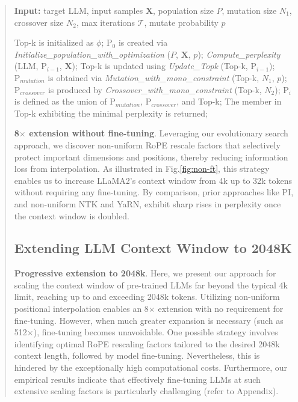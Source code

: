 \begin{abstract}
\begin{algorithm}[t]
	\small
	\caption{The search algorithm}
	\textbf{Input:} target LLM, input samples $\mathbf{X}$,   population size $P$, mutation size $N_1$, crossover size $N_2$, max iterations $\mathcal{T}$, mutate probability $p$\\

	\begin{algorithmic}[1]
		\label{alg:search}
		\STATE Top-k is initialized as $\phi$;	
		\STATE $\text{P}_0$ is created via \textit{Initialize\_population\_with\_optimization} ($P$, $\mathbf{X}$, $p$); 
		\STATE \textit{Compute\_perplexity} (LLM, $\text{P}_{i-1}$, $\mathbf{X}$);
		\STATE  Top-k is updated using \textit{Update\_Topk} (Top-k, $\text{P}_{i-1}$);
		\STATE$\text{P}_{mutation}$ is obtained via \textit{Mutation\_with\_mono\_constraint} (Top-k, $N_1$, $p$); 
		\STATE $\text{P}_{crossover}$ is produced by \textit{Crossover\_with\_mono\_constraint} (Top-k, $N_2$);
		\STATE $\text{P}_i$ is defined as the union of $\text{P}_{mutation}$, $\text{P}_{crossover}$, and Top-k;
		\ENDFOR
		\STATE The member in Top-k exhibiting the minimal perplexity is returned;
	\end{algorithmic}
\end{algorithm}

\textbf{8$\times$ extension without fine-tuning}. Leveraging our evolutionary search approach, we discover non-uniform RoPE rescale factors that selectively protect important dimensions and positions, thereby reducing information loss from interpolation. As illustrated in Fig.\ref{fig:non-ft}, this strategy enables us to increase LLaMA2's context window from 4k up to 32k tokens without requiring any fine-tuning. By comparison, prior approaches like PI, and non-uniform NTK and YaRN, exhibit sharp rises in perplexity once the context window is doubled.

\subsection{Extending LLM Context Window to 2048K}
\label{sec:extendto2048k}

\textbf{Progressive extension to 2048k}. Here, we present our approach for scaling the context window of pre-trained LLMs far beyond the typical 4k limit, reaching up to and exceeding 2048k tokens. Utilizing non-uniform positional interpolation enables an 8$\times$ extension with no requirement for fine-tuning. However, when much greater expansion is necessary (such as 512$\times$), fine-tuning becomes unavoidable. One possible strategy involves identifying optimal RoPE rescaling factors tailored to the desired 2048k context length, followed by model fine-tuning. Nevertheless, this is hindered by the exceptionally high computational costs. Furthermore, our empirical results indicate that effectively fine-tuning LLMs at such extensive scaling factors is particularly challenging (refer to Appendix).


\end{abstract}
